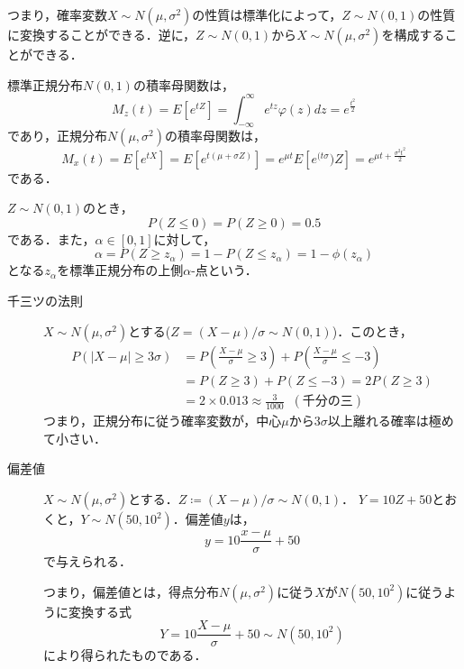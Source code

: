 \documentclass{jsreport}
\begin{document}
つまり，確率変数$X \sim N(\mu, \sigma^2)$の性質は標準化によって，$Z \sim N(0, 1)$の性質に変換することができる．逆に，$Z \sim N(0, 1)$から$X \sim N(\mu, \sigma^2)$を構成することができる．

標準正規分布$N(0, 1)$の積率母関数は，
\begin{equation}
  M_z(t) = E[e^{tZ}] = \int_{-\infty}^{\infty} e^{tz}\varphi(z)dz = e^{\frac{t^2}{2}} \nonumber
\end{equation}
であり，正規分布$N(\mu, \sigma^2)$の積率母関数は，
\begin{equation}
  M_x(t) = E[e^{tX}] = E[e^{t(\mu + \sigma Z)}] = e^{\mu t} E[e^{(t\sigma})Z] = e^{\mu t + \frac{\sigma^2 t^2}{2}} \nonumber
\end{equation}
である．

$Z \sim N(0, 1)$のとき，
\begin{equation}
  P(Z \leq 0) = P(Z \geq 0) = 0.5 \nonumber
\end{equation}
である．また，$\alpha \in [0, 1]$に対して，
\begin{equation}
  \alpha = P(Z \geq z_{\alpha}) = 1 - P(Z \leq z_{\alpha}) = 1 - \phi(z_{\alpha}) \nonumber
\end{equation}
となる$z_{\alpha}$を標準正規分布の上側$\alpha$-点という．

\begin{description}
  \item[千三ツの法則]
  $X \sim N(\mu, \sigma^2)$とする($Z = (X - \mu)/\sigma \sim N(0, 1)$)．このとき，
  \begin{align}
    P(|X - \mu| \geq 3\sigma) &= P\left(\frac{X - \mu}{\sigma} \geq 3\right) + P\left(\frac{X - \mu}{\sigma} \leq -3\right) \nonumber \\
    &= P(Z \geq 3) + P(Z \leq -3) = 2P(Z \geq 3) \nonumber \\
    &= 2 \times 0.013 \approx \frac{3}{1000} \; \; (千分の三) \nonumber
  \end{align}
  つまり，正規分布に従う確率変数が，中心$\mu$から$3\sigma$以上離れる確率は極めて小さい．

  \item[偏差値]
  $X \sim N(\mu, \sigma^2)$とする．$Z \coloneqq (X - \mu)/\sigma \sim N(0, 1)$．
  $Y = 10 Z + 50$とおくと，$Y \sim N(50, 10^2)$．偏差値$y$は，
  \begin{equation}
    y = 10 \frac{x - \mu}{\sigma} + 50 \nonumber
  \end{equation}
  で与えられる．

  つまり，偏差値とは，得点分布$N(\mu, \sigma^2)$に従う$X$が$N(50, 10^2)$に従うように変換する式
  \begin{equation}
    Y = 10 \frac{X - \mu}{\sigma} + 50 \sim N(50, 10^2) \nonumber
  \end{equation}
  により得られたものである．
\end{description}
\end{document}
